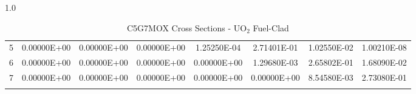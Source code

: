\begin{sidewaysfigure}
\begin{table}[H]
\begin{subtable}[h]{1.0\textwidth}
{\begin{tabular}{*8c}
5 & 0.00000E+00 & 0.00000E+00 & 0.00000E+00 & 1.25250E-04 & 2.71401E-01 & 1.02550E-02 & 1.00210E-08 \\
6 & 0.00000E+00 & 0.00000E+00 & 0.00000E+00 & 0.00000E+00 & 1.29680E-03 & 2.65802E-01 & 1.68090E-02 \\
7 & 0.00000E+00 & 0.00000E+00 & 0.00000E+00 & 0.00000E+00 & 0.00000E+00 & 8.54580E-03 & 2.73080E-01 \\
        \bottomrule
        & & & & & & & 
    \end{tabular}}
  \end{subtable}
    \caption{C5G7MOX Cross Sections - UO$_{2}$ Fuel-Clad}
    \label{table:MOX-FuelClad}
\end{table}
\end{sidewaysfigure}



